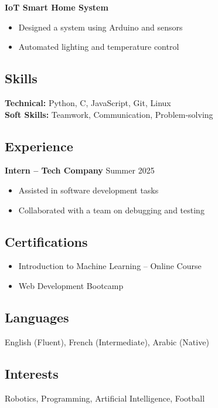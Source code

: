 \documentclass[11pt,a4paper]{article}
\begin{document}
\textbf{IoT Smart Home System} \\
\begin{itemize}
    \item Designed a system using Arduino and sensors
    \item Automated lighting and temperature control
\end{itemize}

\vspace{0.3cm}

\subsection*{Skills}
\textbf{Technical:} Python, C, JavaScript, Git, Linux \\
\textbf{Soft Skills:} Teamwork, Communication, Problem-solving

\vspace{0.3cm}

\subsection*{Experience}
\textbf{Intern – Tech Company} \hfill Summer 2025 \\
\begin{itemize}
    \item Assisted in software development tasks
    \item Collaborated with a team on debugging and testing
\end{itemize}

\vspace{0.3cm}

\subsection*{Certifications}
\begin{itemize}
    \item Introduction to Machine Learning – Online Course
    \item Web Development Bootcamp
\end{itemize}

\vspace{0.3cm}

\subsection*{Languages}
English (Fluent), French (Intermediate), Arabic (Native)

\vspace{0.3cm}

\subsection*{Interests}
Robotics, Programming, Artificial Intelligence, Football

\end{document}
